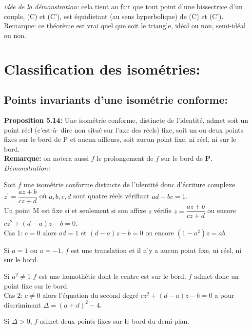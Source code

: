 \documentclass[a4paper, 12pt, twoside]{book}
\begin{document}
 \textit{idée de la démonstration:} cela tient au fait que tout point d'une bissectrice d'un couple, (C) et (C'), est équidistant (au sens hyperbolique) de (C) et (C').\\
 
 Remarque: ce théorème est vrai quel que soit le triangle, idéal ou non, semi-idéal ou non.\\

\section{Classification des isométries:}
\subsection{Points invariants d'une isométrie conforme:}

\textbf{Proposition 5.14:} Une isométrie conforme, distincte de l'identité, admet soit un point réel (c'est-à- dire non situé sur l'axe des réels) fixe, soit un ou deux points fixes sur le bord de P et aucun ailleurs, soit aucun point fixe, ni réel, ni sur le bord.\\

\textbf{Remarque:} on notera aussi $f$ le prolongement de $f$ sur le bord de \textbf{P}.\\

\textit{Démonstration:}\

Soit $f$ une isométrie conforme distincte de l'identité  donc d'écriture complexe $z^{'}=\dfrac{az+b}{cz+d}$ où $a, b, c, d$ sont quatre réels vérifiant $ad-bc=1$.\\

Un point M est fixe si et seulement si son affixe $z$ vérifie $z=\dfrac{az+b}{cz+d}$ ou encore $cz^{2}+(d-a)z-b=0$.\\

Cas 1: $c=0$ alors $ad=1$ et $(d-a)z-b=0$ ou encore $(1-a^{2})z=ab$. \

Si $a=1$ ou $a=-1$, $f$ est une translation et il n'y a aucun point fixe, ni réel, ni sur le bord.\

Si $a^{2} \neq 1$ $f$ est une homothétie dont le centre est sur le bord. $f$ admet donc un point fixe sur le bord.\\

Cas 2: $c\neq 0$ alors l'équation du second degré $cz^{2}+(d-a)z-b=0$ a pour discriminant $\Delta=(a+d)^{2}-4$.\

Si $\Delta>0$, $f$ admet deux points fixes sur le bord du demi-plan.\
\end{document}
